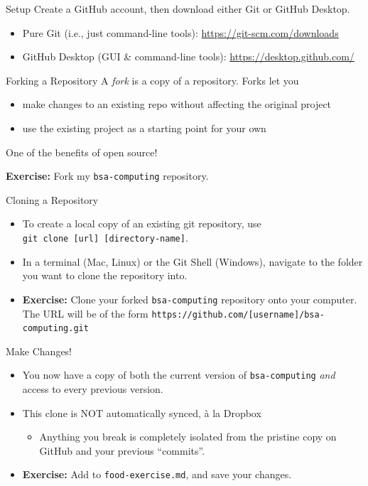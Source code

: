 \documentclass{beamer}
\begin{document}
	\begin{frame}{Setup}
		Create a GitHub account, then download either Git or GitHub Desktop.
		\begin{itemize}
			\item Pure Git (i.e., just command-line tools): \url{https://git-scm.com/downloads}
			\item GitHub Desktop (GUI \& command-line tools): \url{https://desktop.github.com/}
		\end{itemize}
	\end{frame}
	
	\begin{frame}{Forking a Repository}
		A \textit{fork} is a copy of a repository. Forks let you
		\begin{itemize}
			\item make changes to an existing repo without affecting the original project
			\item use the existing project as a starting point for your own
		\end{itemize}
		One of the benefits of open source!
		
		\textbf{Exercise:} Fork my \texttt{bsa-computing} repository.
	\end{frame}
	
	\begin{frame}{Cloning a Repository}
		\begin{itemize}
			\item To create a local copy of an existing git repository, use 
			\\ \texttt{git clone [url] [directory-name]}.
			\item In a terminal (Mac, Linux) or the Git Shell (Windows), navigate to the folder you want to clone the repository into.
			\item \textbf{Exercise:} Clone your forked \texttt{bsa-computing} repository onto your computer. The URL will be of the form \texttt{https://github.com/[username]/bsa-computing.git}
		\end{itemize}
	\end{frame}
	
	\begin{frame}{Make Changes!}
		\begin{itemize}
			\item You now have a copy of both the current version of \texttt{bsa-computing} \textit{and} access to every previous version.
			\item This clone is NOT automatically synced, \`a la Dropbox
			\begin{itemize}
				\item Anything you break is completely isolated from the pristine copy on GitHub and your previous ``commits''.
			\end{itemize}
			\item \textbf{Exercise:} Add to \texttt{food-exercise.md}, and save your changes.
		\end{itemize}
	\end{frame}
	
\end{document}
